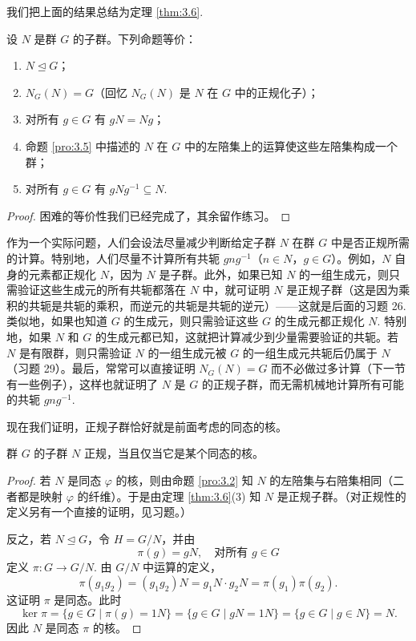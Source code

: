 我们把上面的结果总结为定理 \ref{thm:3.6}.

\begin{theorem}\label{thm:3.6}
设 \(N\) 是群 \(G\) 的子群。下列命题等价：

\begin{enumerate}[label=(\arabic*)]
\item \(N \trianglelefteq G\)；

\item \(N_G(N) = G\)（回忆 \(N_G(N)\) 是 \(N\) 在 \(G\) 中的正规化子）；

\item 对所有 \(g \in G\) 有 \(gN = Ng\)；

\item 命题 \ref{pro:3.5} 中描述的 \(N\) 在 \(G\) 中的左陪集上的运算使这些左陪集构成一个群；

\item 对所有 \(g \in G\) 有 \(gNg^{-1} \subseteq N\).
\end{enumerate}
\end{theorem}

\begin{proof}
困难的等价性我们已经完成了，其余留作练习。
\end{proof}

作为一个实际问题，人们会设法尽量减少判断给定子群 \(N\) 在群 \(G\) 中是否正规所需的计算。特别地，人们尽量不计算所有共轭 \(gng^{-1}\)（\(n \in N\)，\(g \in G\)）。例如，\(N\) 自身的元素都正规化 \(N\)，因为 \(N\) 是子群。此外，如果已知 \(N\) 的一组生成元，则只需验证这些生成元的所有共轭都落在 \(N\) 中，就可证明 \(N\) 是正规子群（这是因为乘积的共轭是共轭的乘积，而逆元的共轭是共轭的逆元）——这就是后面的习题 26. 类似地，如果也知道 \(G\) 的生成元，则只需验证这些 \(G\) 的生成元都正规化 \(N\). 特别地，如果 \(N\) 和 \(G\) 的生成元都已知，这就把计算减少到少量需要验证的共轭。若 \(N\) 是有限群，则只需验证 \(N\) 的一组生成元被 \(G\) 的一组生成元共轭后仍属于 \(N\)（习题 29）。最后，常常可以直接证明 \(N_G(N) = G\) 而不必做过多计算（下一节有一些例子），这样也就证明了 \(N\) 是 \(G\) 的正规子群，而无需机械地计算所有可能的共轭 \(gng^{-1}\).

现在我们证明，正规子群恰好就是前面考虑的同态的核。

\begin{proposition}\label{pro:3.7}
群 \(G\) 的子群 \(N\) 正规，当且仅当它是某个同态的核。
\end{proposition}

\begin{proof}
若 \(N\) 是同态 \(\varphi\) 的核，则由命题 \ref{pro:3.2} 知 \(N\) 的左陪集与右陪集相同（二者都是映射 \(\varphi\) 的纤维）。于是由定理 \ref{thm:3.6}(3) 知 \(N\) 是正规子群。（对正规性的定义另有一个直接的证明，见习题。）

反之，若 \(N \trianglelefteq G\)，令 \(H = G/N\)，并由
\[
\pi(g) = gN, \quad \text{对所有 } g \in G
\]
定义 \(\pi : G \to G/N\). 由 \(G/N\) 中运算的定义，
\[
\pi(g_1 g_2) = (g_1 g_2)N = g_1 N \cdot g_2 N = \pi(g_1)\pi(g_2).
\]
这证明 \(\pi\) 是同态。此时
\[
\ker \pi = \{g \in G \mid \pi(g) = 1N\} = \{g \in G \mid gN = 1N\} = \{g \in G \mid g \in N\} = N.
\]
因此 \(N\) 是同态 \(\pi\) 的核。
\end{proof}


